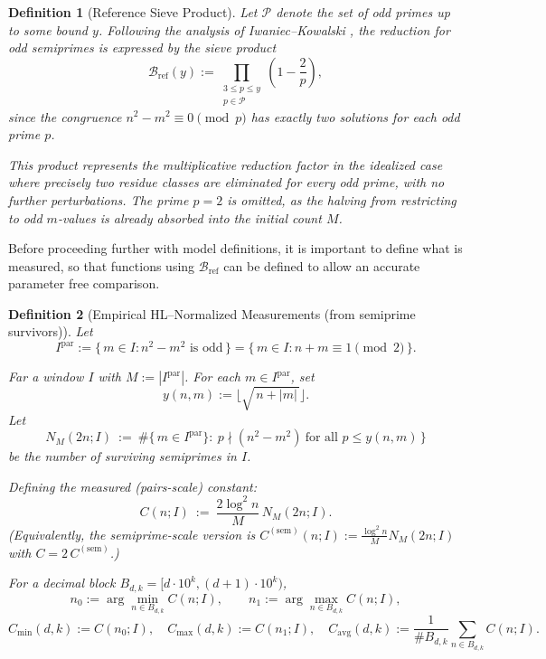 \documentclass[11pt]{article}
\theoremstyle{inline}
\theoremstyle{break}
\theoremstyle{break}
\theoremstyle{break}
\theoremstyle{break}
\theoremstyle{break}
\theoremstyle{break}
\theoremstyle{break}
\newtheorem{definition}{Definition}
\theoremstyle{inline}
\newcommand{\tavg}{{\scriptscriptstyle\mathrm{avg}}}
\newcommand{\tref}{{\scriptscriptstyle\mathrm{ref}}}
\newcommand{\Cmeas}{C}              %
\newcommand{\Nmeas}{n}              %
\newcommand{\Bref}{\mathcal{B}_\tref}
\newcommand{\Ipar}{I^{\mathrm{par}}}
\begin{document}
\begin{definition}[Reference Sieve Product]
\label{def:Bref}
Let \( \mathcal{P} \) denote the set of odd primes up to some bound \( y \).
Following the analysis of Iwaniec–Kowalski \cite{IwaniecKowalski2004}, the reduction for odd semiprimes is expressed by the sieve product
\begin{equation}
\Bref(y)
    := \prod_{\substack{3 \le p \le y \\ p \in \mathcal{P}}}
       \left( 1 - \frac{2}{p} \right),
\end{equation}
since the congruence \( n^2 - m^2 \equiv 0 \pmod{p} \) has exactly two solutions for each odd prime \( p \).

This product represents the multiplicative reduction factor in the
\emph{idealized} case where precisely two residue classes are eliminated
for every odd prime, with no further perturbations. The prime \( p = 2 \)
is omitted, as the halving from restricting to odd \( m \)-values is already
absorbed into the initial count \( M \).
\end{definition}

Before proceeding further with model definitions, it is important to define what is measured, so that functions using \( \Bref \) can be 
defined to allow an accurate parameter free comparison.

\begin{definition}[Empirical HL–Normalized Measurements (from semiprime survivors)]\label{semiprime-survivors}
Let
\begin{equation}
\Ipar := \{\, m\in I : n^2-m^2 \text{ is odd} \,\}
= \{\, m\in I : n+m \equiv 1 \pmod 2 \,\}.
\end{equation}

Far a window \(I\) with \(M:=\left|\Ipar\right|\).
For each \( m \in \Ipar \), set
\begin{equation}
y(n,m):=\bigl\lfloor \sqrt{\,n+|m|\,}\bigr\rfloor .
\end{equation}
Let
\begin{equation}
N_M(2n;I)\ :=\ \#\{\,m\in \Ipar\}:\ p\nmid (n^2-m^2)\ \text{for all }p\le y(n,m)\,\}
\end{equation}
be the number of surviving \emph{semiprimes} in \(I\).

Defining the measured (pairs-scale) constant:
\begin{equation}
\Cmeas(n;I)\ :=\ \frac{2\log^2 n}{M}\,N_M(2n;I).
\end{equation}
(Equivalently, the semiprime-scale version is
\(\Cmeas^{(\mathrm{sem})}(n;I):=\frac{\log^2 n}{M}N_M(2n;I)\) with
\(\Cmeas=2\,\Cmeas^{(\mathrm{sem})}\).)

For a decimal block \(B_{d,k}=[d\cdot10^k,(d+1)\cdot10^k)\),
\begin{equation}
\Nmeas_0:=\arg\min_{n\in B_{d,k}}\Cmeas(n;I),\qquad
\Nmeas_1:=\arg\max_{n\in B_{d,k}}\Cmeas(n;I),
\end{equation}
\begin{equation}
\Cmeas_{\min}(d,k):=\Cmeas(\Nmeas_0;I),\quad
\Cmeas_{\max}(d,k):=\Cmeas(\Nmeas_1;I),\quad
\Cmeas_{\tavg}(d,k):=\frac{1}{\#B_{d,k}}\sum_{n\in B_{d,k}}\Cmeas(n;I).
\end{equation}
\end{definition}
\end{document}
